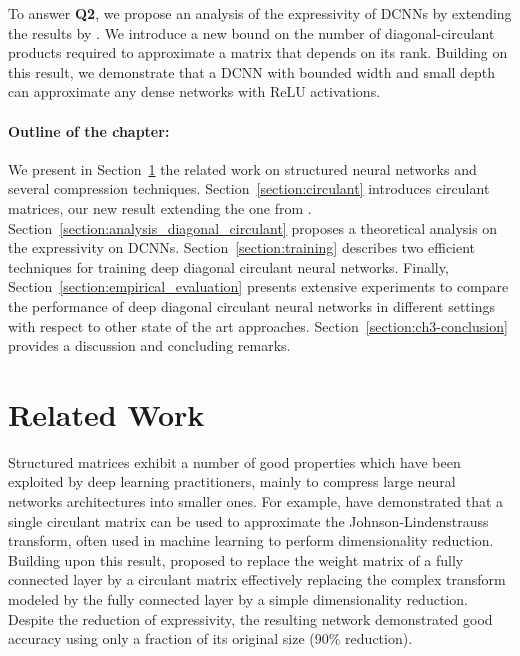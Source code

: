 To answer \textbf{Q2}, we propose an analysis of the expressivity of DCNNs by extending the results by \citet{Huhtanen2015}.
We introduce a new bound on the number of diagonal-circulant products required to approximate a matrix that depends on its rank.
Building on this result, we demonstrate that a DCNN with bounded width and small depth can approximate any dense networks with ReLU activations. 

\paragraph{Outline of the chapter:}
We present in Section~\ref{section:ch3-related_work} the related work on structured neural networks and several compression techniques.
Section~\ref{section:circulant} introduces circulant matrices, our new result extending the one from \citet{Huhtanen2015}.
Section~\ref{section:analysis_diagonal_circulant} proposes a theoretical analysis on the expressivity on DCNNs.
Section~\ref{section:training} describes two efficient techniques for training deep diagonal circulant neural networks.
Finally, Section~\ref{section:empirical_evaluation} presents extensive experiments to compare the performance of deep diagonal circulant neural networks in different settings with respect to other state of the art approaches.
Section~\ref{section:ch3-conclusion} provides a discussion and concluding remarks.


\section{Related Work}
\label{section:ch3-related_work}

Structured matrices exhibit a number of good properties which have been exploited by deep learning practitioners, mainly to compress large neural networks architectures into smaller ones.
For example, \citet{hinrichs2011johnson} have demonstrated that a single circulant matrix can be used to approximate the Johnson-Lindenstrauss transform, often used in machine learning to perform dimensionality reduction.
Building upon this result, \citet{cheng} proposed to replace the weight matrix of a fully connected layer by a circulant matrix effectively replacing the complex transform modeled by the fully connected layer by a simple dimensionality reduction.
Despite the reduction of expressivity, the resulting network demonstrated good accuracy using only a fraction of its original size (90\% reduction).


